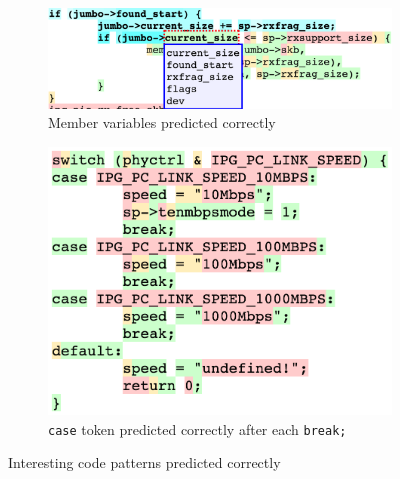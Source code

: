 \begin{figure}[t!]
\begin{subfigure}{\linewidth}
  \includegraphics[width=\linewidth]{figs/example7.png}
  \caption{Member variables predicted correctly}
  \label{fig:memvar}
\end{subfigure}
\begin{subfigure}{\linewidth}
  \includegraphics[width=0.6\linewidth]{figs/example1.png}
  \caption{{\tt case} token predicted correctly after each {\tt break;}}
  \label{fig:breakcase}
\end{subfigure}
  \caption{Interesting code patterns predicted correctly}
  \label{fig:moreexamples}
\end{figure}
